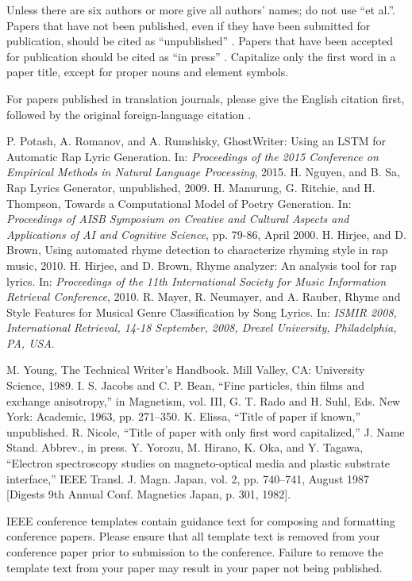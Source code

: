 \documentclass[conference]{IEEEtran}
\begin{document}
Unless there are six authors or more give all authors' names; do not use 
``et al.''. Papers that have not been published, even if they have been 
submitted for publication, should be cited as ``unpublished'' \cite{b4}. Papers 
that have been accepted for publication should be cited as ``in press'' \cite{b5}. 
Capitalize only the first word in a paper title, except for proper nouns and 
element symbols.

For papers published in translation journals, please give the English 
citation first, followed by the original foreign-language citation \cite{b6}.

\begin{thebibliography}{00}
 P. Potash, A. Romanov, and A. Rumshisky, GhostWriter: Using an LSTM for Automatic Rap Lyric Generation. In: \emph{Proceedings of the 2015 Conference on Empirical Methods in Natural Language Processing}, 2015.
 H. Nguyen, and B. Sa, Rap Lyrics Generator, unpublished, 2009.
 H. Manurung, G. Ritchie, and H. Thompson, Towards a Computational Model of Poetry Generation. In: \emph{Proceedings of AISB Symposium on Creative and Cultural Aspects and Applications of AI and Cognitive Science}, pp. 79-86, April 2000.
 H. Hirjee, and D. Brown, Using automated rhyme detection to characterize rhyming style in rap music, 2010.
 H. Hirjee, and D. Brown, Rhyme analyzer: An analysis tool for rap lyrics. In: \emph{Proceedings of the 11th International Society for Music Information Retrieval Conference}, 2010.
 R. Mayer, R. Neumayer, and A. Rauber, Rhyme and Style Features for Musical Genre Classification by Song Lyrics. In: \emph{ISMIR 2008,  International Retrieval, 14-18 September, 2008, Drexel University, Philadelphia, PA, USA}.

 M. Young, The Technical Writer's Handbook. Mill Valley, CA: University Science, 1989.
 I. S. Jacobs and C. P. Bean, ``Fine particles, thin films and exchange anisotropy,'' in Magnetism, vol. III, G. T. Rado and H. Suhl, Eds. New York: Academic, 1963, pp. 271--350.
 K. Elissa, ``Title of paper if known,'' unpublished.
 R. Nicole, ``Title of paper with only first word capitalized,'' J. Name Stand. Abbrev., in press.
 Y. Yorozu, M. Hirano, K. Oka, and Y. Tagawa, ``Electron spectroscopy studies on magneto-optical media and plastic substrate interface,'' IEEE Transl. J. Magn. Japan, vol. 2, pp. 740--741, August 1987 [Digests 9th Annual Conf. Magnetics Japan, p. 301, 1982].

\end{thebibliography}
\vspace{12pt}
\color{red}
IEEE conference templates contain guidance text for composing and formatting conference papers. Please ensure that all template text is removed from your conference paper prior to submission to the conference. Failure to remove the template text from your paper may result in your paper not being published.
\end{document}

